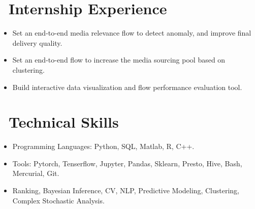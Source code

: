 \documentclass{resume}
\begin{document}
\begin{spacing}{1.0}
		\vspace{-0.10in}
		\section{\faUsers\ Internship Experience}
		\begin{itemize}
			\item Set an end-to-end media relevance flow to detect anomaly, and improve final delivery quality. 
			\item Set an end-to-end flow to increase the media sourcing pool based on clustering.
			\item Build interactive data visualization and flow performance evaluation tool.
		\end{itemize}
		
		\vspace{-0.20in}
		
		\section{\faInfo\ Technical Skills}
		\begin{itemize}[parsep=0.5ex]
			\item Programming Languages: Python, SQL, Matlab, R, C++.
			\item Tools: Pytorch, Tenserflow, Jupyter, Pandas, Sklearn, Presto, Hive, Bash, Mercurial, Git.
			\item Ranking, Bayesian Inference, CV, NLP, Predictive Modeling, Clustering, Complex Stochastic Analysis.
		\end{itemize}
		
		\vspace{-0.20in}
		

\end{spacing}
\end{document}

